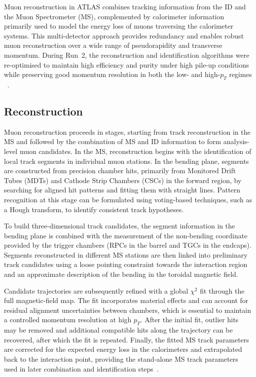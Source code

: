 Muon reconstruction in ATLAS combines tracking information from the ID and the
Muon Spectrometer (MS), complemented by calorimeter information primarily used
to model the energy loss of muons traversing the calorimeter systems.
This multi-detector approach provides redundancy and enables robust muon
reconstruction over a wide range of pseudorapidity and transverse momentum.
During Run~2, the reconstruction and identification algorithms were re-optimised
to maintain high efficiency and purity under high pile-up conditions while
preserving good momentum resolution in both the low- and high-$p_T$ regimes%
~\cite{ATLASMuonReco2021,ATLASMuonReco2016}.

\subsection{Reconstruction}

Muon reconstruction proceeds in stages, starting from track reconstruction in the
MS and followed by the combination of MS and ID information to form analysis-level
muon candidates.
In the MS, reconstruction begins with the identification of local track segments
in individual muon stations.
In the bending plane, segments are constructed from precision chamber hits,
primarily from Monitored Drift Tubes (MDTs) and Cathode Strip Chambers (CSCs) in
the forward region, by searching for aligned hit patterns and fitting them with
straight lines.
Pattern recognition at this stage can be formulated using voting-based techniques,
such as a Hough transform, to identify consistent track hypotheses.

To build three-dimensional track candidates, the segment information in the
bending plane is combined with the measurement of the non-bending coordinate
provided by the trigger chambers (RPCs in the barrel and TGCs in the endcaps).
Segments reconstructed in different MS stations are then linked into preliminary
track candidates using a loose pointing constraint towards the interaction
region and an approximate description of the bending in the toroidal magnetic
field.

Candidate trajectories are subsequently refined with a global $\chi^2$ fit
through the full magnetic-field map.
The fit incorporates material effects and can account for residual alignment
uncertainties between chambers, which is essential to maintain a controlled
momentum resolution at high $p_T$.
After the initial fit, outlier hits may be removed and additional compatible hits
along the trajectory can be recovered, after which the fit is repeated.
Finally, the fitted MS track parameters are corrected for the expected energy loss
in the calorimeters and extrapolated back to the interaction point, providing the
stand-alone MS track parameters used in later combination and identification
steps~\cite{ATLASMuonReco2021}.

